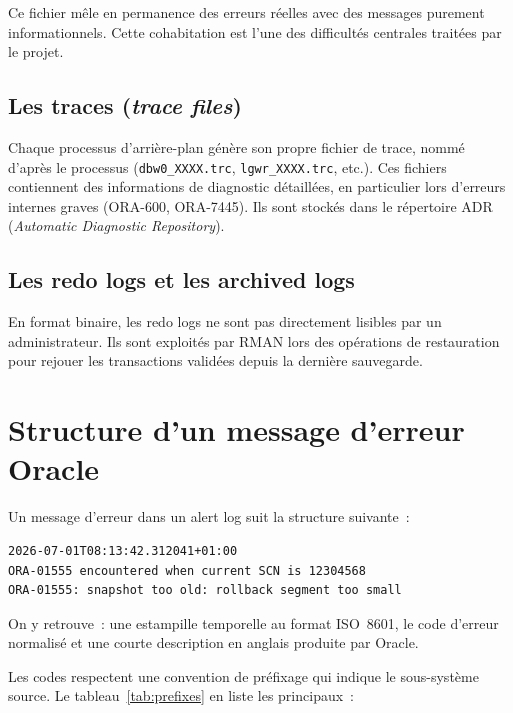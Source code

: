 \documentclass[12pt,a4paper]{report}
\begin{document}
Ce fichier m\^ele en permanence des erreurs r\'eelles avec des messages purement
informationnels. Cette cohabitation est l'une des difficult\'es centrales trait\'ees
par le projet.

\subsection{Les traces (\emph{trace files})}

Chaque processus d'arri\`ere-plan g\'en\`ere son propre fichier de trace, nomm\'e
d'apr\`es le processus (\texttt{dbw0\_XXXX.trc}, \texttt{lgwr\_XXXX.trc}, etc.).
Ces fichiers contiennent des informations de diagnostic d\'etaill\'ees, en particulier
lors d'erreurs internes graves (ORA-600, ORA-7445). Ils sont stock\'es dans le
r\'epertoire ADR (\emph{Automatic Diagnostic Repository}).

\subsection{Les redo logs et les archived logs}

En format binaire, les redo logs ne sont pas directement lisibles par un administrateur.
Ils sont exploit\'es par RMAN lors des op\'erations de restauration pour rejouer les
transactions valid\'ees depuis la derni\`ere sauvegarde.

\section{Structure d'un message d'erreur Oracle}

Un message d'erreur dans un alert log suit la structure suivante~:

\begin{lstlisting}[language={},caption={Extrait type d'un alert log Oracle},label=lst:alertlog]
2026-07-01T08:13:42.312041+01:00
ORA-01555 encountered when current SCN is 12304568
ORA-01555: snapshot too old: rollback segment too small
\end{lstlisting}

On y retrouve~: une estampille temporelle au format ISO~8601, le code d'erreur normalis\'e
et une courte description en anglais produite par Oracle.

Les codes respectent une convention de pr\'efixage qui indique le sous-syst\`eme source.
Le tableau~\ref{tab:prefixes} en liste les principaux~:
\end{document}
